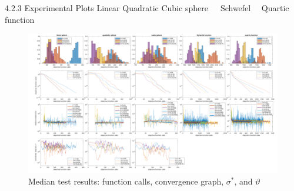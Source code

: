 \documentclass{beamer}
\begin{document}
\begin{frame}{4.2.3 Experimental Plots}
\qquad Linear \qquad Quadratic \qquad Cubic sphere\ \ \ Schwefel \ \  Quartic function
\begin{figure}
\includegraphics[width=1.0\linewidth]{merged_plot_emergency_v4_final.pdf}
    \caption{Median test results: function calls, convergence graph, $\sigma^*$, and $\vartheta$}
\end{figure}
\end{frame}
\end{document}
